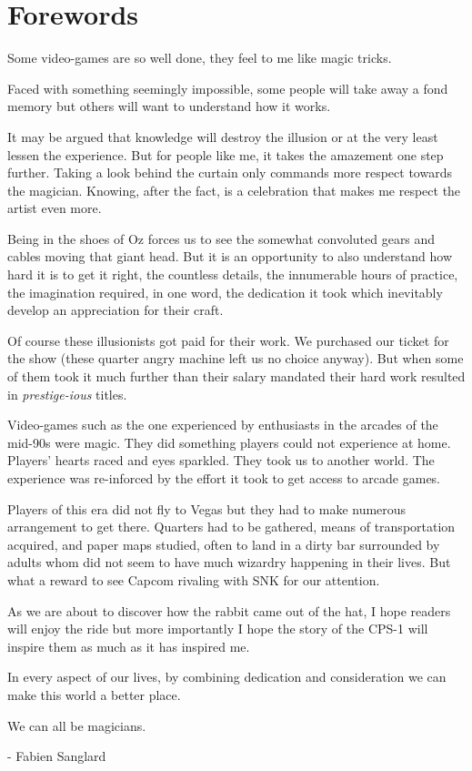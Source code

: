\chapter*{Forewords}

Some video-games are so well done, they feel to me like magic tricks.

Faced with something seemingly impossible, some people will take away a fond memory but others will want to understand
how it works.

It may be argued that knowledge will destroy the illusion or at the very least lessen the experience. But for people like me, it takes the amazement one step further. Taking a look behind the curtain only commands more respect towards the magician. Knowing, after the fact, is a celebration that makes me respect the artist even more.

Being in the shoes of Oz forces us to see the somewhat convoluted gears and cables moving that giant head. But it is an opportunity to also understand how hard it is to get it right, the countless details, the innumerable hours of practice, the imagination required, in one word, the dedication it took which inevitably develop an appreciation for their craft.


Of course these illusionists got paid for their work. We purchased our ticket for the show (these quarter angry machine left us no choice anyway). But when some of them took it much further than their salary mandated their hard work resulted in \emph{prestige-ious} titles.

Video-games such as the one experienced by enthusiasts in the arcades of the mid-90s were magic. They did something players could not experience at home. Players' hearts raced and eyes sparkled. They took us to another world. The experience was re-inforced by the effort it took to get access to arcade games. 

Players of this era did not fly to Vegas but they had to make numerous arrangement to get there. Quarters had to be gathered,  means of transportation acquired, and paper maps studied, often to land in a dirty bar surrounded by adults whom did not seem to have much wizardry happening in their lives. But what a reward to see Capcom rivaling with SNK for our attention. 

As we are about to discover how the rabbit came out of the hat, I hope readers will enjoy the ride but more importantly I hope the story of the CPS-1 will inspire them as much as it has inspired me.

In every aspect of our lives, by combining dedication and consideration we can make this world a better place. 

We can all be magicians.

- Fabien Sanglard